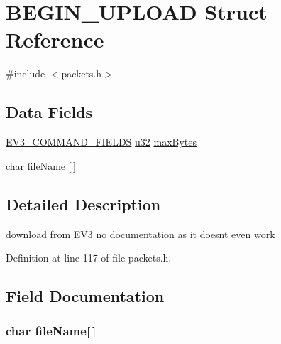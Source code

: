 \hypertarget{struct_b_e_g_i_n___u_p_l_o_a_d}{}\section{B\+E\+G\+I\+N\+\_\+\+U\+P\+L\+O\+A\+D Struct Reference}
\label{struct_b_e_g_i_n___u_p_l_o_a_d}


{\ttfamily \#include $<$packets.\+h$>$}

\subsection*{Data Fields}
\begin{DoxyCompactItemize}
\item 
\hyperlink{packets_8h_a0c26a010ef0da2962a751796943824c9}{E\+V3\+\_\+\+C\+O\+M\+M\+A\+N\+D\+\_\+\+F\+I\+E\+L\+D\+S} \hyperlink{defs_8h_afaa62991928fb9fb18ff0db62a040aba}{u32} \hyperlink{struct_b_e_g_i_n___u_p_l_o_a_d_afaa1cba2adac85d9d83f4671acc5fbf8}{max\+Bytes}
\item 
char \hyperlink{struct_b_e_g_i_n___u_p_l_o_a_d_ac7c25075c755b642c1861936c4615beb}{file\+Name} \mbox{[}$\,$\mbox{]}
\end{DoxyCompactItemize}


\subsection{Detailed Description}
download from E\+V3 no documentation as it doesn\textquotesingle{}t even work 

Definition at line 117 of file packets.\+h.



\subsection{Field Documentation}
\hypertarget{struct_b_e_g_i_n___u_p_l_o_a_d_ac7c25075c755b642c1861936c4615beb}{}
\subsubsection[{file\+Name}]{\setlength{\rightskip}{0pt plus 5cm}char file\+Name\mbox{[}$\,$\mbox{]}}\label{struct_b_e_g_i_n___u_p_l_o_a_d_ac7c25075c755b642c1861936c4615beb}


